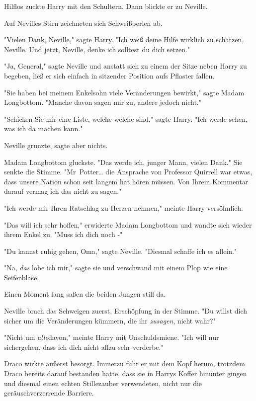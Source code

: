 {Hilflos zuckte Harry mit den Schultern. Dann blickte er zu Neville.

Auf Nevilles Stirn zeichneten sich Schweißperlen ab.

"Vielen Dank, Neville," sagte Harry. "Ich weiß deine Hilfe wirklich zu schätzen, Neville. Und jetzt, Neville, denke ich solltest du dich setzen."

"Ja, General," sagte Neville und anstatt sich zu einem der Sitze neben Harry zu begeben, ließ er sich einfach in sitzender Position aufs Pflaster fallen.

"Sie haben bei meinem Enkelsohn viele Veränderungen bewirkt," sagte Madam Longbottom. "Manche davon sagen mir zu, andere jedoch nicht."

"Schicken Sie mir eine Liste, welche welche sind," sagte Harry. "Ich werde sehen, was ich da machen kann."

Neville grunzte, sagte aber nichts.

Madam Longbottom gluckste. "Das werde ich, junger Mann, vielen Dank." Sie senkte die Stimme. "Mr~Potter… die Ansprache von Professor Quirrell war etwas, dass unsere Nation schon seit langem hat hören müssen. Von Ihrem Kommentar darauf vermag ich das nicht zu sagen."

"Ich werde mir Ihren Ratschlag zu Herzen nehmen," meinte Harry versöhnlich.

"Das will ich sehr hoffen," erwiderte Madam Longbottom und wandte sich wieder ihrem Enkel zu. "Muss ich dich noch -"

"Du kannst ruhig gehen, Oma," sagte Neville. "Diesmal schaffe ich es allein."

"Na, \emph{das} lobe ich mir," sagte sie und verschwand mit einem Plop wie eine Seifenblase.

Einen Moment lang saßen die beiden Jungen still da.

Neville brach das Schweigen zuerst, Erschöpfung in der Stimme. "Du willst dich sicher um die Veränderungen kümmern, die ihr \emph{zusagen}, nicht wahr?"

"Nicht um \emph{alle}davon," meinte Harry mit Unschuldsmiene. "Ich will nur sichergehen, dass ich dich nicht allzu sehr verderbe."

\later

Draco wirkte äußerst besorgt. Immerzu fuhr er mit dem Kopf herum, trotzdem Draco bereits darauf bestanden hatte, dass sie in Harrys Koffer hinunter gingen und diesmal einen echten Stillezauber verwendeten, nicht nur die geräuschverzerrende Barriere.

}
